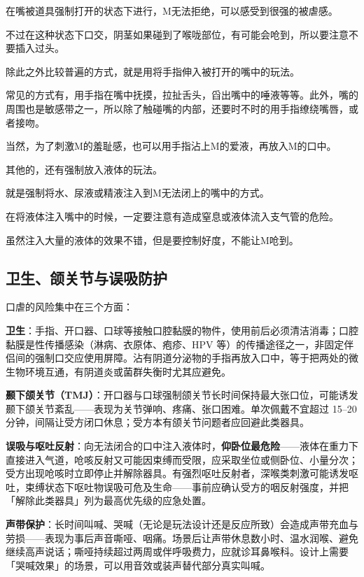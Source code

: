 \documentclass[12pt,UTF8]{ctexbook}
\begin{document}
在嘴被道具强制打开的状态下进行，M无法拒绝，可以感受到很强的被虐感。

不过在这种状态下口交，阴茎如果碰到了喉咙部位，有可能会呛到，所以要注意不要插入过头。

除此之外比较普遍的方式，就是用将手指伸入被打开的嘴中的玩法。

常见的方式有，用手指在嘴中抚摸，拉扯舌头，舀出嘴中的唾液等等。此外，嘴的周围也是敏感带之一，所以除了触碰嘴的内部，还要时不时的用手指缭绕嘴唇，或者接吻。

当然，为了刺激M的羞耻感，也可以用手指沾上M的爱液，再放入M的口中。

其他的，还有强制放入液体的玩法。

就是强制将水、尿液或精液注入到M无法闭上的嘴中的方式。

在将液体注入嘴中的时候，一定要注意有造成窒息或液体流入支气管的危险。

虽然注入大量的液体的效果不错，但是要控制好度，不能让M呛到。

\subsection{卫生、颌关节与误吸防护}

口虐的风险集中在三个方面：

\noindent\textbf{卫生}：手指、开口器、口球等接触口腔黏膜的物件，使用前后必须清洁消毒；口腔黏膜是性传播感染（淋病、衣原体、疱疹、HPV 等）的传播途径之一，非固定伴侣间的强制口交应使用屏障。沾有阴道分泌物的手指再放入口中，等于把两处的微生物环境互通，有阴道炎或菌群失衡时尤其应避免。

\noindent\textbf{颞下颌关节（TMJ）}：开口器与口球强制颌关节长时间保持最大张口位，可能诱发颞下颌关节紊乱——表现为关节弹响、疼痛、张口困难。单次佩戴不宜超过 15--20 分钟，间隔让受方闭口休息；受方本有颌关节问题者应回避此类器具。

\noindent\textbf{误吸与呕吐反射}：向无法闭合的口中注入液体时，\textbf{仰卧位最危险}——液体在重力下直接进入气道，呛咳反射又可能因束缚而受限，应采取坐位或侧卧位、小量分次；受方出现呛咳时立即停止并解除器具。有强烈呕吐反射者，深喉类刺激可能诱发呕吐，束缚状态下呕吐物误吸可危及生命——事前应确认受方的咽反射强度，并把「解除此类器具」列为最高优先级的应急处置。

\noindent\textbf{声带保护}：长时间叫喊、哭喊（无论是玩法设计还是反应所致）会造成声带充血与劳损——表现为事后声音嘶哑、咽痛。场景后让声带休息数小时、温水润喉、避免继续高声说话；嘶哑持续超过两周或伴呼吸费力，应就诊耳鼻喉科。设计上需要「哭喊效果」的场景，可以用音效或装声替代部分真实叫喊。
\end{document}
